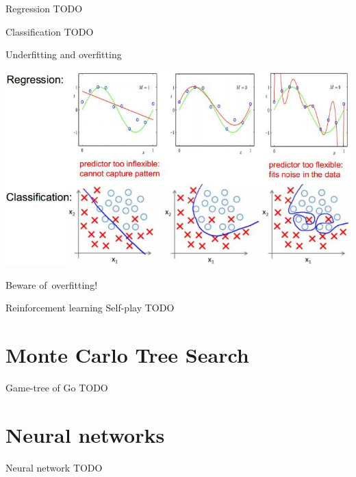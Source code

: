 \documentclass{beamer}
\newcommand{\todo}{\alert{TODO}}
\begin{document}
  \begin{frame}{Regression}
    \todo
  \end{frame}

  \begin{frame}{Classification}
    \todo
  \end{frame}

  {
    \begin{frame}{Underfitting and overfitting}
      \begin{center}
        \includegraphics[width=.75\textwidth]{../img/underfitting_and_overfitting.jpg}
        \pause

        Beware of~overfitting!
      \end{center}
    \end{frame}
  }

  \begin{frame}{Reinforcement learning}
    \alert{Self-play}
    \todo
  \end{frame}


  \section{Monte Carlo Tree Search}
  \begin{frame}{Game-tree of Go}
    \todo
  \end{frame}


  \section{Neural networks}
  \begin{frame}{Neural network}
    \todo
  \end{frame}
\end{document}
